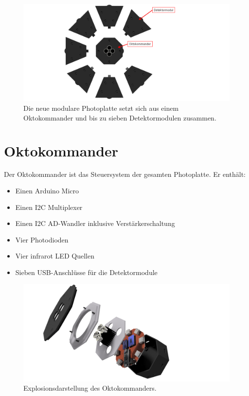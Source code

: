 \documentclass{sciposter}
\begin{document}
\begin{multicols}{3}
\begin{figure}[h]
	\centering
	\includegraphics[scale=0.8]{../CAD_Bilder/Gestikulaser/Gestikulaser_raytraced_2_beschriftet.png}
	\caption{Die neue modulare Photoplatte setzt sich aus einem Oktokommander und bis zu sieben Detektormodulen zusammen.}
	\label{fig:PhotoplatteAlpha}
\end{figure}


\section{Oktokommander}
\noindent
Der Oktokommander ist das Steuersystem der gesamten Photoplatte. Er enthält:
\begin{itemize}
	\item Einen Arduino Micro
	\item Einen I2C Multiplexer
	\item Einen I2C AD-Wandler inklusive Verstärkerschaltung
	\item Vier Photodioden
	\item Vier infrarot LED Quellen
	\item Sieben USB-Anschlüsse für die Detektormodule
\end{itemize}

\begin{figure}[h]
	\centering
	\includegraphics[scale=0.5]{../CAD_Bilder/Oktokommander/Oktokommander_raytraced.png}
	\caption{Explosionsdarstellung des Oktokommanders.}
	\label{fig:Oktokommander}
\end{figure}


\end{multicols}
\end{document}

